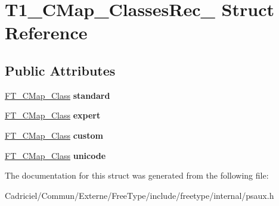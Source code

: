 \hypertarget{struct_t1___c_map___classes_rec__}{\section{T1\-\_\-\-C\-Map\-\_\-\-Classes\-Rec\-\_\- Struct Reference}
\label{struct_t1___c_map___classes_rec__}
}
\subsection*{Public Attributes}
\begin{DoxyCompactItemize}
\item 
\hypertarget{struct_t1___c_map___classes_rec___a11bc9e986af1c0cf91bd67e2e30028ca}{\hyperlink{struct_f_t___c_map___class_rec__}{F\-T\-\_\-\-C\-Map\-\_\-\-Class} {\bfseries standard}}\label{struct_t1___c_map___classes_rec___a11bc9e986af1c0cf91bd67e2e30028ca}

\item 
\hypertarget{struct_t1___c_map___classes_rec___a9576c404d5197dd66498725eacde1302}{\hyperlink{struct_f_t___c_map___class_rec__}{F\-T\-\_\-\-C\-Map\-\_\-\-Class} {\bfseries expert}}\label{struct_t1___c_map___classes_rec___a9576c404d5197dd66498725eacde1302}

\item 
\hypertarget{struct_t1___c_map___classes_rec___a21378ef457d58cc00f357011f45fba5e}{\hyperlink{struct_f_t___c_map___class_rec__}{F\-T\-\_\-\-C\-Map\-\_\-\-Class} {\bfseries custom}}\label{struct_t1___c_map___classes_rec___a21378ef457d58cc00f357011f45fba5e}

\item 
\hypertarget{struct_t1___c_map___classes_rec___aab1eef66893dd7b0d25897612d056d4a}{\hyperlink{struct_f_t___c_map___class_rec__}{F\-T\-\_\-\-C\-Map\-\_\-\-Class} {\bfseries unicode}}\label{struct_t1___c_map___classes_rec___aab1eef66893dd7b0d25897612d056d4a}

\end{DoxyCompactItemize}


The documentation for this struct was generated from the following file\-:\begin{DoxyCompactItemize}
\item 
Cadriciel/\-Commun/\-Externe/\-Free\-Type/include/freetype/internal/psaux.\-h\end{DoxyCompactItemize}

